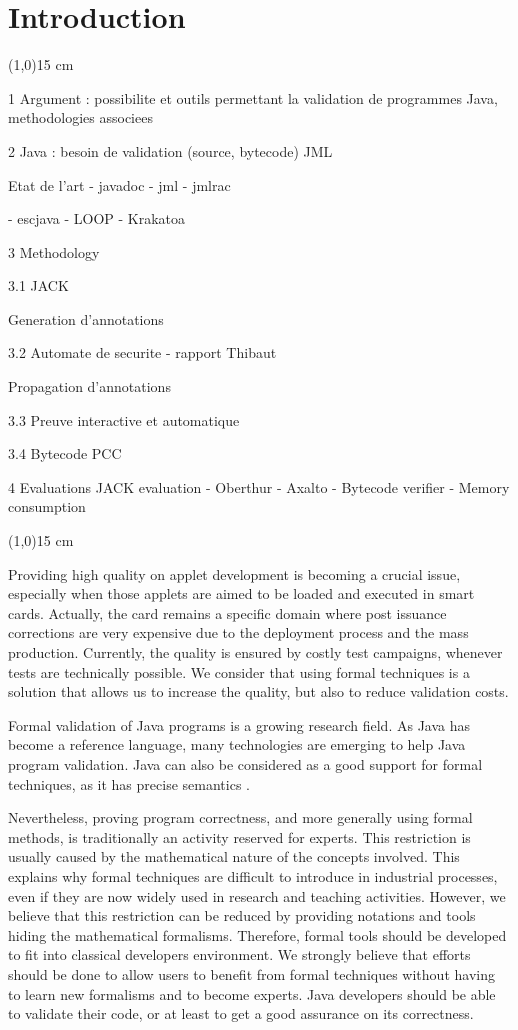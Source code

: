 \chapter{Introduction}

\line(1,0){15 cm}

1 Argument : possibilite et outils permettant la validation de programmes Java, methodologies associees

2 Java : besoin de validation (source, bytecode)
  JML

Etat de l'art
- javadoc
- jml
- jmlrac

- escjava
- LOOP
- Krakatoa

3 Methodology

3.1 JACK

    Generation d'annotations

3.2 Automate de securite - rapport Thibaut

    Propagation d'annotations

3.3 Preuve interactive et automatique

3.4 Bytecode PCC

4 Evaluations
JACK evaluation 
	- Oberthur
	- Axalto
	- Bytecode verifier
	- Memory consumption

\line(1,0){15 cm}

Providing high quality on applet development is becoming a crucial
issue, especially when those applets are aimed to be loaded and executed in smart cards.  Actually, the card
remains a specific domain where post issuance corrections are very expensive due to the deployment process and
the mass production. Currently, the quality is ensured by costly test campaigns, whenever tests are technically
possible. We consider that using formal techniques is a solution that allows us to increase the quality, but
also to reduce validation costs.

 Formal validation of Java programs is a growing research
 field.  As Java has become a reference language, many technologies are
 emerging to help Java program validation.  Java can also be
 considered as a good support for formal techniques, as it has precise semantics \cite{Gosl00a}.

 Nevertheless, proving program correctness, and more generally using
formal methods, is traditionally an activity reserved for experts.  This restriction is usually caused by the
mathematical nature of the concepts involved.  This explains why formal techniques are difficult to introduce in
industrial processes, even if they are now widely used in research and teaching activities.  However, we believe
that this restriction can be reduced by providing notations and tools hiding the mathematical formalisms.
Therefore, formal tools should be developed to fit into classical developers environment.  We strongly believe
that efforts should be done to allow users to benefit from formal techniques without having to learn new
formalisms and to become experts. Java developers should be able to validate their code, or at least to get a
good assurance on its correctness.


